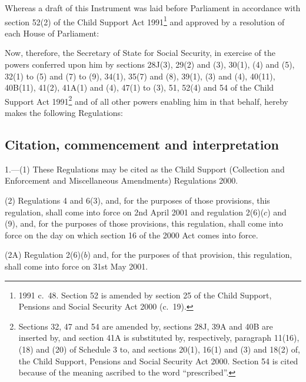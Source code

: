 \documentclass[12pt,a4paper]{article}
\title{\regstitle}
\author{S.I.\ 2001 No.\ 162}
\date{Made
18th January 2001\\
Coming into force
as provided in regulation 1(2) and (3)
}
\begin{document}
\maketitle

\noindent
Whereas a draft of this Instrument was laid before Parliament in accordance with section 52(2) of the Child Support Act 1991\footnote{1991 c.\ 48. Section 52 is amended by section 25 of the Child Support, Pensions and Social Security Act 2000 (c.\ 19).} and approved by a resolution of each House of Parliament:

Now, therefore, the Secretary of State for Social Security, in exercise of the powers conferred upon him by sections 28J(3), 29(2) and (3), 30(1), (4) and (5), 32(1) to (5) and (7) to (9), 34(1), 35(7) and (8), 39(1), (3) and (4), 40(11), 40B(11), 41(2), 41A(1) and (4), 47(1) to (3), 51, 52(4) and 54 of the Child Support Act 1991\footnote{Sections 32, 47 and 54 are amended by, sections 28J, 39A and 40B are inserted by, and section 41A is substituted by, respectively, paragraph 11(16), (18) and (20) of Schedule 3 to, and sections 20(1), 16(1) and (3) and 18(2) of, the Child Support, Pensions and Social Security Act 2000. Section 54 is cited because of the meaning ascribed to the word “prescribed”.} and of all other powers enabling him in that behalf, hereby makes the following Regulations: 

{\sloppy

\tableofcontents

}

\bigskip

\setcounter{secnumdepth}{-2}

\subsection[1. Citation, commencement and interpretation]{Citation, commencement and interpretation}

1.---(1)  These Regulations may be cited as the Child Support (Collection and Enforcement and Miscellaneous Amendments) Regulations 2000.

(2) Regulations 4 and 6(3), and, for the purposes of those provisions, this regulation, shall come into force on 2nd April 2001 and regulation 2(6)($c$)  and (9), and, for the purposes of those provisions, this regulation, shall come into force on the day on which section 16 of the 2000 Act comes into force.

(2A) Regulation 2(6)($b$)  and, for the purposes of that provision, this regulation, shall come into force on 31st May 2001.
\end{document}
